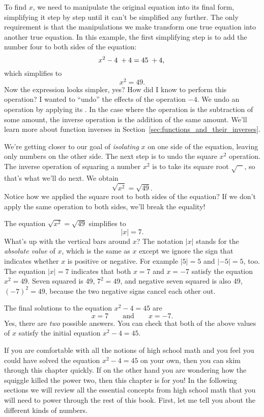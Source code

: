 	To find $x$,
	we need to manipulate the original equation into its final form,
	simplifying it step by step until it can't be simplified any further.
	The only requirement is that the manipulations we make transform one true equation into another true equation.
	In this example,
	the first simplifying step is to add the number four to both sides of the equation:
	\[
	 	x^2-4  \; + 4  	=	45    \; + 4, 	    \\
	\]
	which simplifies to
	\[
		x^2 	 		=	49.
	\]
	Now the expression looks simpler, yes?
	How did I know to perform this operation? 
	I wanted to ``undo'' the effects of the operation $-4$.
	We undo an operation by applying its .
	In the case where the operation is the subtraction of some amount,
	the inverse operation is the addition of the same amount.
	We'll learn more about function inverses in Section~\ref{sec:functions_and_their_inverses}. 

	We're getting closer to our goal of \emph{isolating} $x$ on one side of the equation,							
	leaving only numbers on the other side.
	The next step is to undo the square $x^2$ operation.
	The inverse operation of squaring a number $x^2$ is to take its square root $\sqrt{\phantom{a}\; }$,
	so that's what we'll do next. We obtain
	\[ 
	   \sqrt{x^2} 		= 	\sqrt{49}.
	\]
	Notice how we applied the square root  to both sides of the equation? 
	If we don't apply the same operation to both sides, we'll break the equality!

	The equation $\sqrt{x^2}= \sqrt{49}$ simplifies to 
	\[
	 	|x|	= 	7.
	 \]
	What's up with the vertical bars around $x$?
	The notation $|x|$ stands for the \emph{absolute value} of $x$,											
	which is the same as $x$ except we ignore the sign that indicates whether $x$ is positive or negative. 
	For example $|5|=5$ and $|-5|=5$, too.
	The equation $|x|=7$ indicates that both $x=7$ and $x=-7$ satisfy the equation $x^2 = 49$.
	Seven squared is 49, $7^2=49$, and negative seven squared is also 49, $(-7)^2 = 49$,
	because the two negative signs cancel each other out.

	The final solutions to the equation $x^2-4=45$ are													
	\[
	 x  = 7 \qquad \textrm{and} \qquad   x=  - 7.
	\]
	Yes, there are \emph{two} possible answers. 
	You can check that both of the above values of $x$ satisfy the initial equation $x^2-4=45$.

	\bigskip

	If you are comfortable with all the notions of high school math
	and you feel you could have solved the equation $x^2-4=45$ on your own,		%
	then you can skim through this chapter quickly.
	If on the other hand you are wondering how the squiggle killed the power two,
	then this chapter is for you!
	In the following sections we will review all the essential concepts from
	high school math that you will need to power through the rest of this book.
	First, let me tell you about the different kinds of numbers.

